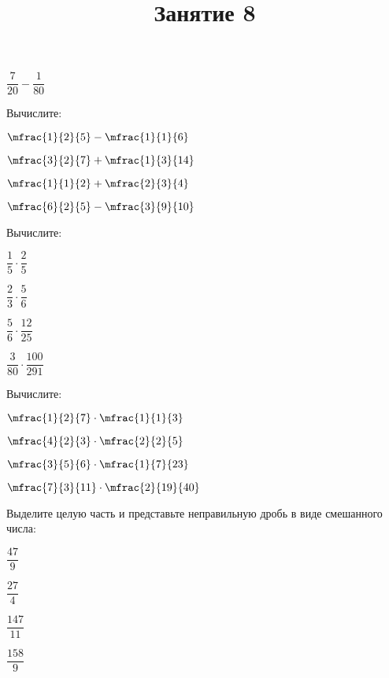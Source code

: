 \begin{listofex}
\begin{enumcols}[itemcolumns=6]
		\item \( \dfrac{7}{20}-\dfrac{1}{80} \)
	\end{enumcols}
	\item Вычислите:
		\begin{enumcols}[itemcolumns=4]
		\item \( \mfrac{1}{2}{5}-\mfrac{1}{1}{6} \)
		\item \( \mfrac{3}{2}{7}+\mfrac{1}{3}{14} \)
		\item \( \mfrac{1}{1}{2}+\mfrac{2}{3}{4} \)
		\item \( \mfrac{6}{2}{5}-\mfrac{3}{9}{10} \)	
	\end{enumcols}
	\item Вычислите:
		\begin{enumcols}[itemcolumns=4]
		\item \( \dfrac{1}{5}\cdot\dfrac{2}{5} \)
		\item \( \dfrac{2}{3}\cdot\dfrac{5}{6} \)
		\item \( \dfrac{5}{6}\cdot\dfrac{12}{25} \)
		\item \( \dfrac{3}{80}\cdot\dfrac{100}{291} \)
	\end{enumcols}
	\item Вычислите:
		\begin{enumcols}[itemcolumns=4]
		\item \( \mfrac{1}{2}{7}\cdot\mfrac{1}{1}{3} \)
		\item \( \mfrac{4}{2}{3}\cdot\mfrac{2}{2}{5} \)
		\item \( \mfrac{3}{5}{6}\cdot\mfrac{1}{7}{23} \)
		\item \( \mfrac{7}{3}{11}\cdot\mfrac{2}{19}{40} \)
	\end{enumcols}
	\item Выделите целую часть и представьте неправильную дробь в виде смешанного числа:
		\begin{enumcols}[itemcolumns=4]
		\item \( \dfrac{47}{9} \)
		\item \( \dfrac{27}{4} \)
		\item \( \dfrac{147}{11} \)
		\item \( \dfrac{158}{9} \)
	\end{enumcols}
\end{listofex}
%
\newpage
\title{Занятие 8}
